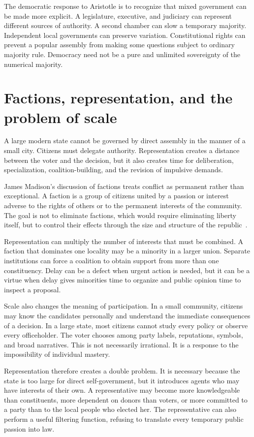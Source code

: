 ﻿\documentclass[12pt,a4paper]{book}
\begin{document}
The democratic response to Aristotle is to recognize that mixed government
can be made more explicit.  A legislature, executive, and judiciary can
represent different sources of authority.  A second chamber can slow a
temporary majority.  Independent local governments can preserve variation.
Constitutional rights can prevent a popular assembly from making some
questions subject to ordinary majority rule.  Democracy need not be a pure
and unlimited sovereignty of the numerical majority.

\section{Factions, representation, and the problem of scale}

A large modern state cannot be governed by direct assembly in the manner of
a small city.  Citizens must delegate authority.  Representation creates a
distance between the voter and the decision, but it also creates time for
deliberation, specialization, coalition-building, and the revision of
impulsive demands.

James Madison's discussion of factions treats conflict as permanent rather
than exceptional.  A faction is a group of citizens united by a passion or
interest adverse to the rights of others or to the permanent interests of
the community.  The goal is not to eliminate factions, which would require
eliminating liberty itself, but to control their effects through the size
and structure of the republic~\cite{Madison1787}.

Representation can multiply the number of interests that must be combined.
A faction that dominates one locality may be a minority in a larger union.
Separate institutions can force a coalition to obtain support from more
than one constituency.  Delay can be a defect when urgent action is needed,
but it can be a virtue when delay gives minorities time to organize and
public opinion time to inspect a proposal.

Scale also changes the meaning of participation.  In a small community,
citizens may know the candidates personally and understand the immediate
consequences of a decision.  In a large state, most citizens cannot study
every policy or observe every officeholder.  The voter chooses among party
labels, reputations, symbols, and broad narratives.  This is not necessarily
irrational.  It is a response to the impossibility of individual mastery.

Representation therefore creates a double problem.  It is necessary because
the state is too large for direct self-government, but it introduces agents
who may have interests of their own.  A representative may become more
knowledgeable than constituents, more dependent on donors than voters, or
more committed to a party than to the local people who elected her.  The
representative can also perform a useful filtering function, refusing to
translate every temporary public passion into law.
\end{document}
